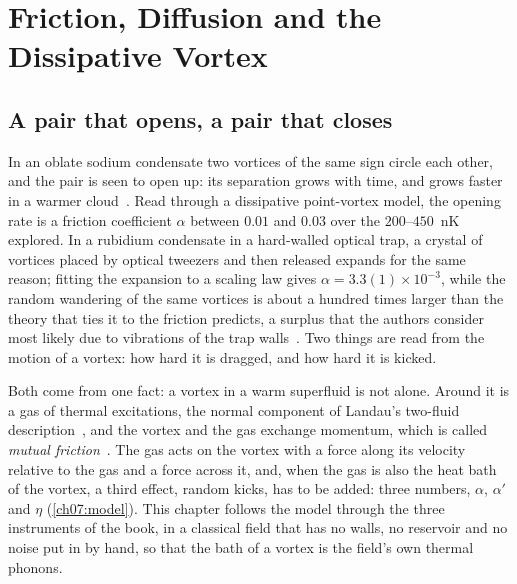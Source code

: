 \chapter{Friction, Diffusion and the Dissipative Vortex}\label{ch07}
\raggedbottom%
\edef\chsevenwp{\the\widowpenalty}\edef\chsevencp{\the\clubpenalty}  %

\section{A pair that opens, a pair that closes}\label{ch07:intro}

In an oblate sodium condensate two vortices of the same sign circle each other, and the pair is seen to open up: its separation grows with time, and grows faster in a warmer
cloud~\cite{Moon2015}. Read through a dissipative point-vortex model, the opening rate is a friction coefficient $\alpha$ between $0.01$ and $0.03$ over the
$200$--$450$~nK explored. In a rubidium condensate in a hard-walled optical trap, a crystal of vortices placed by optical tweezers and then released expands for the same reason;
fitting the expansion to a scaling law gives $\alpha=3.3(1)\times10^{-3}$, while the random wandering of the same vortices is about a hundred times larger than the theory that ties
it to the friction predicts, a surplus that the authors consider most likely due to vibrations of the trap walls~\cite{Neely2024}. Two things are read from the motion of a vortex: how
hard it is dragged, and how hard it is kicked.

Both come from one fact: a vortex in a warm superfluid is not alone. Around it is a gas of thermal excitations, the normal component of Landau's two-fluid
description~\cite{Landau1941}, and the vortex and the gas exchange momentum, which is called \emph{mutual friction}~\cite{Donnelly1991,Sergeev2023}. The gas acts on the vortex with a force along
its velocity relative to the gas and a force across it, and, when the gas is also the heat bath of the vortex, a third effect, random kicks, has to be added: three numbers, $\alpha$, $\alpha'$ and
$\eta$ (\cref{ch07:model}). This chapter follows the model through the three instruments of the book, in a classical field that has no walls, no reservoir and no noise put in by hand, so that the bath
of a vortex is the field's own thermal phonons.

